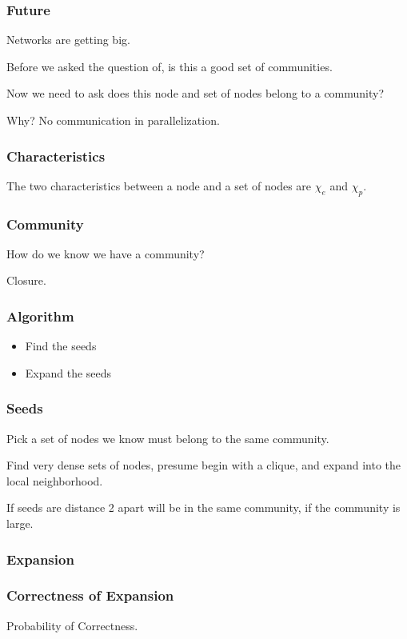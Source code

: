 \documentclass{beamer}
\begin{document}
\begin{frame}\frametitle{Future}

Networks are getting big.

Before we asked the question of, is this a good set of communities.

Now we need to ask does this node and set of nodes belong to a community?

Why?  No communication in parallelization.

\end{frame}

\begin{frame}\frametitle{Characteristics}

The two characteristics between a node and a set of nodes are $\chi_e$ and $\chi_p$.

\end{frame}

\begin{frame}\frametitle{Community}

How do we know we have a community?

Closure.

\end{frame}


\begin{frame}\frametitle{Algorithm}

\begin{itemize}
\item Find the seeds
\item Expand the seeds
\end{itemize}


\end{frame}


\begin{frame}\frametitle{Seeds}

Pick a set of nodes we know must belong to the same community.

Find very dense sets of nodes, presume begin with a clique, and expand into the local neighborhood.

If seeds are distance 2 apart will be in the same community, if the community is large.

\end{frame}



\begin{frame}\frametitle{Expansion}

\end{frame}


\begin{frame}\frametitle{Correctness of Expansion}

Probability of Correctness.

\end{frame}
\end{document}
